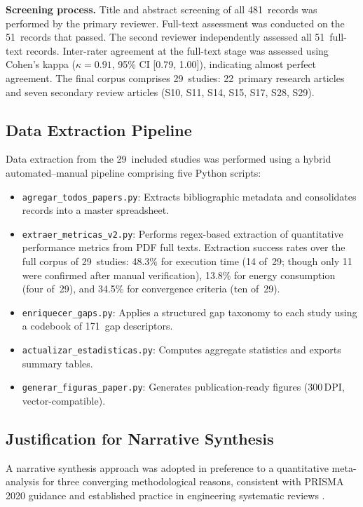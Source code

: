 \documentclass[review,3p]{elsarticle}
\begin{document}
\textbf{Screening process.} Title and abstract screening of all 481~records
was performed by the primary reviewer. Full-text assessment was conducted on
the 51~records that passed. The second reviewer independently assessed all
51~full-text records. Inter-rater agreement at the full-text stage was assessed
using Cohen's kappa ($\kappa=0.91$, 95\% CI [0.79, 1.00]), indicating almost
perfect agreement. The final corpus comprises 29~studies: 22~primary research
articles and seven secondary review articles (S10, S11, S14, S15, S17, S28, S29).

\subsection{Data Extraction Pipeline}

Data extraction from the 29~included studies was performed using a hybrid
automated--manual pipeline comprising five Python scripts:

\begin{itemize}
  \item \texttt{agregar\_todos\_papers.py}: Extracts bibliographic metadata
  and consolidates records into a master spreadsheet.
  \item \texttt{extraer\_metricas\_v2.py}: Performs regex-based extraction
  of quantitative performance metrics from PDF full texts. Extraction success
  rates over the full corpus of 29~studies: 48.3\% for execution time
  (14 of~29; though only 11 were confirmed after manual verification), 13.8\%
  for energy consumption (four of~29), and 34.5\% for convergence criteria (ten of~29).
  \item \texttt{enriquecer\_gaps.py}: Applies a structured gap taxonomy to
  each study using a codebook of 171~gap descriptors.
  \item \texttt{actualizar\_estadisticas.py}: Computes aggregate statistics
  and exports summary tables.
  \item \texttt{generar\_figuras\_paper.py}: Generates publication-ready
  figures (300\,DPI, vector-compatible).
\end{itemize}

\subsection{Justification for Narrative Synthesis}
\label{subsec:narrative_synthesis}

A narrative synthesis approach was adopted in preference to a quantitative
meta-analysis for three converging methodological reasons, consistent with
PRISMA 2020 guidance \cite{page2021} and established practice in engineering
systematic reviews \cite{brambilla2013}.
\end{document}
